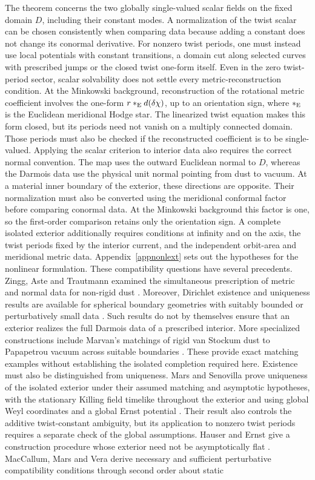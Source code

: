 \documentclass[amsmath,amsfonts,amssymb,aps,pra,superscriptaddress,10pt]{revtex4-2}
\numberwithin{equation}{section}
\theoremstyle{plain}
\theoremstyle{definition}
\theoremstyle{remark}
\theoremstyle{definition}
\begin{document}
The theorem concerns the two globally single-valued scalar fields on the fixed domain $D$, including their constant modes. A normalization of the twist scalar can be chosen consistently when comparing data because adding a constant does not change its conormal derivative. For nonzero twist periods, one must instead use local potentials with constant transitions, a domain cut along selected curves with prescribed jumps or the closed twist one-form itself. Even in the zero twist-period sector, scalar solvability does not settle every metric-reconstruction condition. At the Minkowski background, reconstruction of the rotational metric coefficient involves the one-form $r*_{\rm{E}}d(\delta\chi)$, up to an orientation sign, where $*_{\rm{E}}$ is the Euclidean meridional Hodge star. The linearized twist equation makes this form closed, but its periods need not vanish on a multiply connected domain. Those periods must also be checked if the reconstructed coefficient is to be single-valued. Applying the scalar criterion to interior data also requires the correct normal convention. The map uses the outward Euclidean normal to $D$, whereas the Darmois data use the physical unit normal pointing from dust to vacuum. At a material inner boundary of the exterior, these directions are opposite. Their normalization must also be converted using the meridional conformal factor before comparing conormal data. At the Minkowski background this factor is one, so the first-order comparison retains only the orientation sign. A complete isolated exterior additionally requires conditions at infinity and on the axis, the twist periods fixed by the interior current, and the independent orbit-area and meridional metric data. Appendix~\ref{appnonlext} sets out the hypotheses for the nonlinear formulation. These compatibility questions have several precedents. Zingg, Aste and Trautmann examined the simultaneous prescription of metric and normal data for non-rigid dust \cite{ZinggAsteTrautmann2007ASTP}. Moreover, Dirichlet existence and uniqueness results are available for spherical boundary geometries with suitably bounded or perturbatively small data \cite{SchaudtPfister1996PRL,Schaudt1998CMP,Klenk1999ANZIAM}. Such results do not by themselves ensure that an exterior realizes the full Darmois data of a prescribed interior. More specialized constructions include Marvan's matchings of rigid van Stockum dust to Papapetrou vacuum across suitable boundaries \cite{Marvan2023JGP}. These provide exact matching examples without establishing the isolated completion required here. Existence must also be distinguished from uniqueness. Mars and Senovilla prove uniqueness of the isolated exterior under their assumed matching and asymptotic hypotheses, with the stationary Killing field timelike throughout the exterior and using global Weyl coordinates and a global Ernst potential \cite{MarsSenovilla1998MPLA}. Their result also controls the additive twist-constant ambiguity, but its application to nonzero twist periods requires a separate check of the global assumptions. Hauser and Ernst give a construction procedure whose exterior need not be asymptotically flat \cite{HauserErnst2001GRG}. MacCallum, Mars and Vera derive necessary and sufficient perturbative compatibility conditions through second order about static 
\end{document}
